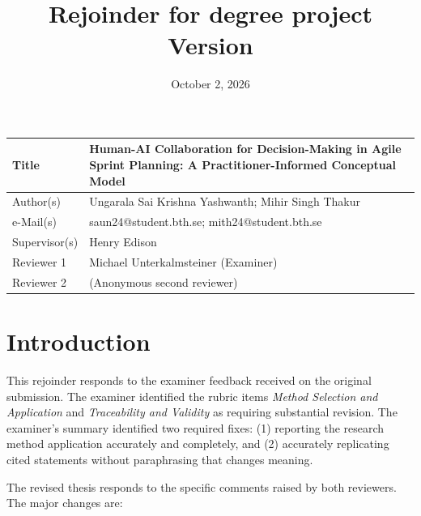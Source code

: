 \documentclass[12pt,a4paper,twoside]{article}
\title{Rejoinder for degree project\\\vspace{1mm}\small{Version \theVersion}}
\author{\textsc{\theCourse}}
\date{October 2, 2026}
\begin{document}
\maketitle
\vspace*{-5mm}

\noindent
\begin{tabular}{|l|p{12.85cm}|}
\hline
Title         & Human-AI Collaboration for Decision-Making in Agile Sprint Planning: A Practitioner-Informed Conceptual Model \\
\hline
Author(s)     & Ungarala Sai Krishna Yashwanth; Mihir Singh Thakur \\
\hline
e-Mail(s)     & saun24@student.bth.se; mith24@student.bth.se \\
\hline
Supervisor(s) & Henry Edison \\
\hline\hline
Reviewer 1    & Michael Unterkalmsteiner (Examiner) \\
\hline
Reviewer 2    & (Anonymous second reviewer) \\
\hline
\end{tabular}

\section{Introduction}

This rejoinder responds to the examiner feedback received on the original submission.
The examiner identified the rubric items \textit{Method Selection and Application} and
\textit{Traceability and Validity} as requiring substantial revision. The examiner's
summary identified two required fixes:
(1) reporting the
research method application accurately and completely, and (2) accurately replicating
cited statements without paraphrasing that changes meaning.

The revised thesis responds to the specific comments raised by both reviewers. The
major changes are:
\end{document}
